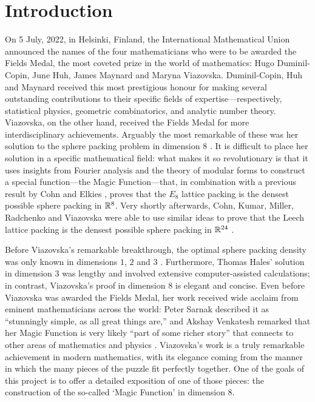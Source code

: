 \chapter{Introduction}
\thispagestyle{empty}

On 5 July, 2022, in Helsinki, Finland, the International Mathematical Union announced the names of the four mathematicians who were to be awarded the Fields Medal, the most coveted prize in the world of mathematics: Hugo Duminil-Copin, June Huh, James Maynard and Maryna Viazovska. Duminil-Copin, Huh and Maynard received this most prestigious honour for making several outstanding contributions to their specific fields of expertise---respectively, statistical physics, geometric combinatorics, and analytic number theory. Viazovska, on the other hand, received the Fields Medal for more interdisciplinary achievements. Arguably the most remarkable of these was her solution to the sphere packing problem in dimension 8 \cite{Viazovska8}. It is difficult to place her solution in a specific mathematical field: what makes it so revolutionary is that it uses insights from Fourier analysis and the theory of modular forms to construct a special function---the Magic Function---that, in combination with a previous result by Cohn and Elkies \cite{CohnElkies}, proves that the $E_8$ lattice packing is the densest possible sphere packing in $\mathbb{R}^8$. Very shortly afterwards, Cohn, Kumar, Miller, Radchenko and Viazovska were able to use similar ideas to prove that the Leech lattice packing is the densest possible sphere packing in $\mathbb{R}^{24}$ \cite{Viazovska24}.

Before Viazovska's remarkable breakthrough, the optimal sphere packing density was only known in dimensions $1$, $2$ and $3$ \cite{CohnOnViazovskaICM}. Furthermore, Thomas Hales' solution in dimension $3$ \cite{HalesKeplerInformal} was lengthy and involved extensive computer-assisted calculations; in contrast, Viazovska's proof in dimension $8$ is elegant and concise. Even before Viazovska was awarded the Fields Medal, her work received wide acclaim from eminent mathematicians across the world: Peter Sarnak described it as ``stunningly simple, as all great things are,'' and Akshay Venkatesh remarked that her Magic Function is very likely ``part of some richer story'' that connects to other areas of mathematics and physics \cite{QuantaPiece}. Viazovska's work is a truly remarkable achievement in modern mathematics, with its elegance coming from the manner in which the many pieces of the puzzle fit perfectly together. One of the goals of this project is to offer a detailed exposition of one of those pieces: the construction of the so-called `Magic Function' in dimension $8$.



